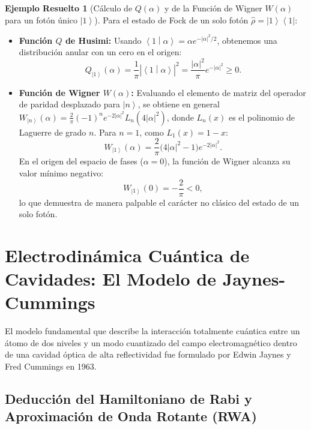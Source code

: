 \documentclass[11pt,a4paper,twoside]{report}
\theoremstyle{definition}
\newtheorem{ejemplo}{Ejemplo Resuelto}[chapter]
\theoremstyle{plain}
\theoremstyle{remark}
\newcommand{\ket}[1]{\left| #1 \right\rangle}
\newcommand{\braket}[2]{\left\langle #1 \middle| #2 \right\rangle}
\newcommand{\ketbra}[2]{\left| #1 \right\rangle\!\left\langle #2 \right|}
\newcommand{\op}[1]{\hat{#1}}
\begin{document}
\begin{ejemplo}[Cálculo de $Q(\alpha)$ y de la Función de Wigner $W(\alpha)$ para un fotón único $\ket{1}$]
Para el estado de Fock de un solo fotón $\op{\rho} = \ketbra{1}{1}$:
\begin{itemize}
    \item \textbf{Función $Q$ de Husimi:} Usando $\braket{1}{\alpha} = \alpha e^{-|\alpha|^2/2}$, obtenemos una distribución anular con un cero en el origen:
    \begin{equation}
        Q_{\ket{1}}(\alpha) = \frac{1}{\pi}|\braket{1}{\alpha}|^2 = \frac{|\alpha|^2}{\pi}e^{-|\alpha|^2} \ge 0.
    \end{equation}
    \item \textbf{Función de Wigner $W(\alpha)$:} Evaluando el elemento de matriz del operador de paridad desplazado para $\ket{n}$, se obtiene en general $W_{\ket{n}}(\alpha) = \frac{2}{\pi}(-1)^n e^{-2|\alpha|^2} L_n(4|\alpha|^2)$, donde $L_n(x)$ es el polinomio de Laguerre de grado $n$. Para $n = 1$, como $L_1(x) = 1 - x$:
    \begin{equation}
        W_{\ket{1}}(\alpha) = \frac{2}{\pi}\big(4|\alpha|^2 - 1\big)e^{-2|\alpha|^2}.
    \end{equation}
    En el origen del espacio de fases ($\alpha = 0$), la función de Wigner alcanza su valor mínimo negativo:
    \begin{equation}
        W_{\ket{1}}(0) = -\frac{2}{\pi} < 0,
    \end{equation}
    lo que demuestra de manera palpable el carácter no clásico del estado de un solo fotón.
\end{itemize}
\end{ejemplo}

\section{Electrodinámica Cuántica de Cavidades: El Modelo de Jaynes-Cummings}

El modelo fundamental que describe la interacción totalmente cuántica entre un átomo de dos niveles y un modo cuantizado del campo electromagnético dentro de una cavidad óptica de alta reflectividad fue formulado por Edwin Jaynes y Fred Cummings en 1963.

\subsection{Deducción del Hamiltoniano de Rabi y Aproximación de Onda Rotante (RWA)}
\end{document}
